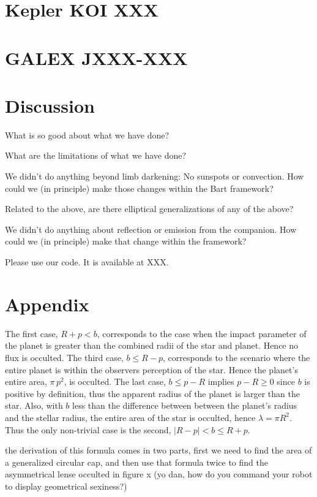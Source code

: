 \documentclass[12pt,preprint]{aastex}
\newcommand{\project}[1]{{\sffamily #1}}
\begin{document}
\section{Kepler KOI XXX}

\section{GALEX JXXX-XXX}

\section{Discussion}

What is so good about what we have done?

What are the limitations of what we have done?

We didn't do anything beyond limb darkening:  No sunspots or convection.
How could we (in principle) make those changes within the \project{Bart} framework?

Related to the above, are there elliptical generalizations of any of the above?

We didn't do anything about reflection or emission from the companion.
How could we (in principle) make that change within the framework?

Please use our code.  It is available at XXX.

\acknowledgments

\section{Appendix}

The first case, $R+p < b$, corresponds to the case when the impact parameter of
the planet is greater than the combined radii of the star and planet. Hence no
flux is occulted.  The third case, $b \leq R-p$, corresponds to the scenario
where the entire planet is within the observers perception of the star.  Hence
the planet's entire area, $\pi \, p^2$, is occulted.  The last case, $b \leq p-R$ implies
$p-R \geq 0$ since $b$ is positive by definition, thus the apparent radius of the
planet is larger than the star.  Also, with $b$ less than the difference between
between the planet's radius and the stellar radius, the entire area
of the star is occulted, hence $\lambda = \pi R^2$.  Thus the only non-trivial
case is the second, $|R-p| < b \leq R+p$.

the derivation of this formula comes in two parts, first we need to find the area of
a generalized circular cap, and then use that formula twice to find the asymmetrical
lense occulted in figure x (yo dan, how do you command your robot to display geometrical sexiness?)
\end{document}
